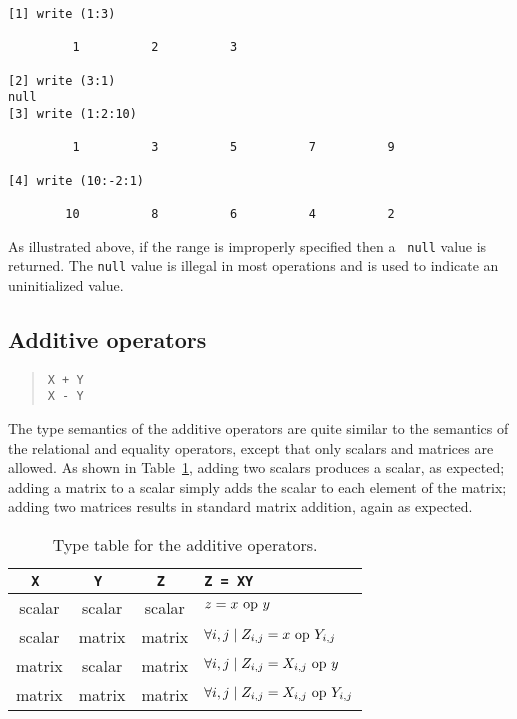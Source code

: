 \begin{screen}
\begin{verbatim}
[1] write (1:3) 

         1          2          3 

[2] write (3:1)
null
[3] write (1:2:10)

         1          3          5          7          9 

[4] write (10:-2:1)

        10          8          6          4          2 
\end{verbatim}
\end{screen}

As illustrated above, if the range is improperly specified then a {\tt
null} value is returned.  The {\tt null} value is illegal in most
operations and is used to indicate an uninitialized value.


\subsection{Additive operators}
\label{burlap.op.additive}

\begin{quote}
\begin{verbatim}
X + Y
X - Y
\end{verbatim}
\end{quote}

The type semantics of the additive operators are quite similar to the
semantics of the relational and equality operators, except that only
scalars and matrices are allowed.  As shown in
Table~\ref{burlap.additive.types}, adding two scalars produces a
scalar, as expected; adding a matrix to a scalar simply adds the
scalar to each element of the matrix; adding two matrices results in
standard matrix addition, again as expected.

\begin{table}[htbp]
\begin{center}
\begin{tabular}{c|c|c|l}
\tt X  & \tt Y	& \tt Z	 & \tt Z = X\op Y				    \\
\hline
scalar & scalar & scalar & $z = x \mbox{\rm\ op } y$				    \\
scalar & matrix	& matrix & $\forall i,j \mid Z_{i,j} = x \mbox{\rm\ op } Y_{i,j}$	    \\
matrix & scalar	& matrix & $\forall i,j \mid Z_{i,j} = X_{i,j} \mbox{\rm\ op } y$	    \\
matrix & matrix	& matrix & $\forall i,j \mid Z_{i,j} = X_{i,j} \mbox{\rm\ op } Y_{i,j}$ \\
\end{tabular}
\caption{Type table for the additive operators.}
\label{burlap.additive.types}
\end{center}
\end{table}

